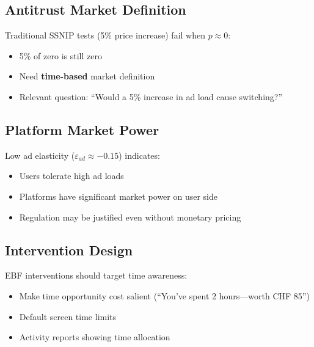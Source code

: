 \subsection{Antitrust Market Definition}

\begin{tcolorbox}[colback=red!5!white, colframe=red!75!black,
    title=Implication 1: SSNIP Test Failure]
Traditional SSNIP tests (5\% price increase) fail when $p \approx 0$:
\begin{itemize}[nosep]
\item 5\% of zero is still zero
\item Need \textbf{time-based} market definition
\item Relevant question: ``Would a 5\% increase in ad load cause switching?''
\end{itemize}
\end{tcolorbox}

\subsection{Platform Market Power}

\begin{tcolorbox}[colback=red!5!white, colframe=red!75!black,
    title=Implication 2: Ad Load Pricing Power]
Low ad elasticity ($\varepsilon_{ad} \approx -0.15$) indicates:
\begin{itemize}[nosep]
\item Users tolerate high ad loads
\item Platforms have significant market power on user side
\item Regulation may be justified even without monetary pricing
\end{itemize}
\end{tcolorbox}

\subsection{Intervention Design}

\begin{tcolorbox}[colback=red!5!white, colframe=red!75!black,
    title=Implication 3: Attention Nudges]
EBF interventions should target time awareness:
\begin{itemize}[nosep]
\item Make time opportunity cost salient (``You've spent 2 hours---worth CHF 85'')
\item Default screen time limits
\item Activity reports showing time allocation
\end{itemize}
\end{tcolorbox}

